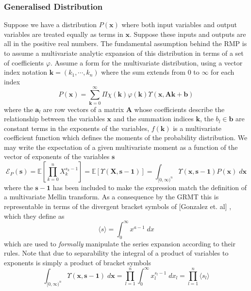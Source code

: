 \documentclass[journal=jcisd8,manuscript=article,layout=onecolumn,pdftex,floatfix,amsmath,amssymb,10pt]{achemso}
\begin{document}
\subsubsection{Generalised Distribution}
Suppose we have a distribution $P(\mathbf{x})$ where both input variables and output variables are treated equally as terms in $\mathbf{x}$. Suppose these inputs and outputs are all in the positive real numbers. The fundamental assumption behind the RMP is to assume a multivariate analytic expansion of this distribution in terms of a set of coefficients $\varphi$. Assume a form for the multivariate distribution, using a vector index notation $\mathbf{k} = (k_1, \cdots, k_n)$ where the sum extends from $0$ to $\infty$ for each index
\begin{equation}
P(\mathbf{x}) = \sum_{\mathbf{k}=0}^\infty  \Pi\chi(\mathbf{k})\varphi(\mathbf{k})\Upsilon(\mathbf{x},\mathbf{A}\mathbf{k}+\mathbf{b})
\end{equation}
where the $\mathbf{a}_l$ are row vectors of a matrix $\mathbf{A}$ whose coefficients describe the relationship between the variables $\mathbf{x}$ and the summation indices $\mathbf{k}$, the $b_l \in \mathbf{b}$ are constant terms in the exponents of the variables, $f(\mathbf{k})$ is a multivariate coefficient function which defines the moments of the probability distribution. We may write the expectation of a given multivariate moment as a function of the vector of exponents of the variables $\mathbf{s}$
$$
\mathcal{E}_P(\mathbf{s}) = \mathbb{E}\left[\prod_{k=0}^n X_k^{s_k-1}\right] = \mathbb{E}\left[\Upsilon(\mathbf{X},\mathbf{s}-\mathbf{1})\right] =\int_{[0,\infty)^{n}} \Upsilon(\mathbf{x},\mathbf{s}-\mathbf{1}) P(\mathbf{x}) \; d \mathbf{x}
$$
where the $\mathbf{s}-\mathbf{1}$ has been included to make the expression match the definition of a multivariate Mellin transform. As a consequence by the GRMT this is representable in terms of the divergent bracket symbols of [Gonzalez et. al] \cite{}, which they define as
\begin{equation}
\langle s \rangle = \int_0^\infty x^{a-1} \; dx
\end{equation}
which are used to \emph{formally} manipulate the series expansion according to their rules. Note that due to separability the integral of a product of variables to exponents is simply a product of bracket symbols
\begin{equation}
\int_{[0,\infty)^n} \Upsilon(\mathbf{x},\mathbf{s-1})\;d \mathbf{x} = \prod_{l=1}^n \int_0^\infty x_l^{s_l-1} \; dx_l = \prod_{l=1}^n \langle s_l \rangle
\label{eqn:bracket}
\end{equation} 
\end{document}
